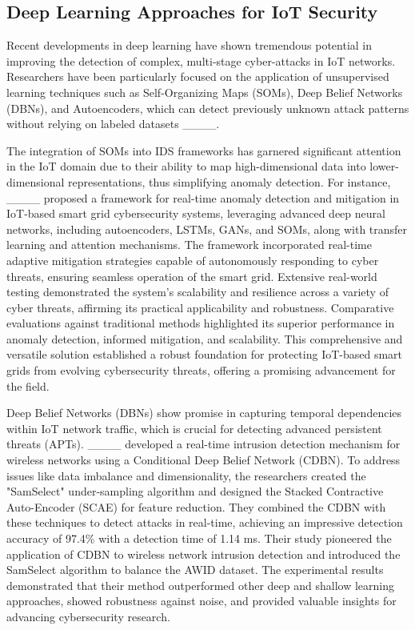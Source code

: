 \subsection{Deep Learning Approaches for IoT Security}
Recent developments in deep learning have shown tremendous potential in improving the detection of complex, multi-stage cyber-attacks in IoT networks. Researchers have been particularly focused on the application of unsupervised learning techniques such as Self-Organizing Maps (SOMs), Deep Belief Networks (DBNs), and Autoencoders, which can detect previously unknown attack patterns without relying on labeled datasets ____.

The integration of SOMs into IDS frameworks has garnered significant attention in the IoT domain due to their ability to map high-dimensional data into lower-dimensional representations, thus simplifying anomaly detection. For instance, ____ proposed a framework for real-time anomaly detection and mitigation in IoT-based smart grid cybersecurity systems, leveraging advanced deep neural networks, including autoencoders, LSTMs, GANs, and SOMs, along with transfer learning and attention mechanisms. The framework incorporated real-time adaptive mitigation strategies capable of autonomously responding to cyber threats, ensuring seamless operation of the smart grid. Extensive real-world testing demonstrated the system’s scalability and resilience across a variety of cyber threats, affirming its practical applicability and robustness. Comparative evaluations against traditional methods highlighted its superior performance in anomaly detection, informed mitigation, and scalability. This comprehensive and versatile solution established a robust foundation for protecting IoT-based smart grids from evolving cybersecurity threats, offering a promising advancement for the field.

Deep Belief Networks (DBNs) show promise in capturing temporal dependencies within IoT network traffic, which is crucial for detecting advanced persistent threats (APTs). ____ developed a real-time intrusion detection mechanism for wireless networks using a Conditional Deep Belief Network (CDBN). To address issues like data imbalance and dimensionality, the researchers created the "SamSelect" under-sampling algorithm and designed the Stacked Contractive Auto-Encoder (SCAE) for feature reduction. They combined the CDBN with these techniques to detect attacks in real-time, achieving an impressive detection accuracy of 97.4\% with a detection time of 1.14 ms. Their study pioneered the application of CDBN to wireless network intrusion detection and introduced the SamSelect algorithm to balance the AWID dataset. The experimental results demonstrated that their method outperformed other deep and shallow learning approaches, showed robustness against noise, and provided valuable insights for advancing cybersecurity research.

